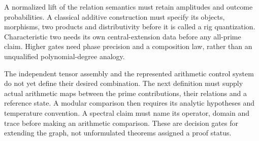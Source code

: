 A normalized lift of the relation semantics must retain amplitudes and
outcome probabilities. A classical additive construction must specify its
objects, morphisms, two products and distributivity before it is called a
rig quantization. Characteristic two needs its own central-extension data
before any all-prime claim. Higher gates need phase precision and a
composition law, rather than an unqualified polynomial-degree analogy.

The independent tensor assembly and the represented arithmetic control
system do not yet define their desired combination. The next definition
must supply actual arithmetic maps between the prime contributions, their
relations and a reference state. A modular comparison then requires its
analytic hypotheses and temperature convention. A spectral claim must
name its operator, domain and trace before making an arithmetic comparison.
These are decision gates for extending the graph, not unformulated theorems
assigned a proof status.
